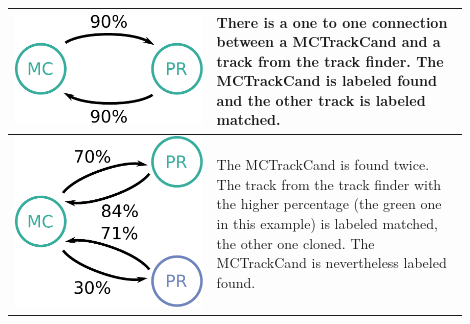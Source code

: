 \begin{table}
  \centering
  \begin{tabular}{m{0.4\linewidth}m{0.5\linewidth}} \toprule
    \centering \includegraphics[width=0.8\linewidth]{figures/theory/fom_found.pdf} & There is a one to one connection between a MCTrackCand and a track from the track finder. The MCTrackCand is labeled found and the other track is labeled matched. \\ \midrule
    \centering \includegraphics[width=0.8\linewidth]{figures/theory/fom_clone.pdf} & The MCTrackCand is found twice. The track from the track finder with the higher percentage (the green one in this example) is labeled matched, the other one cloned. The MCTrackCand is nevertheless labeled found. \\  \midrule

\end{tabular}
\end{table}
